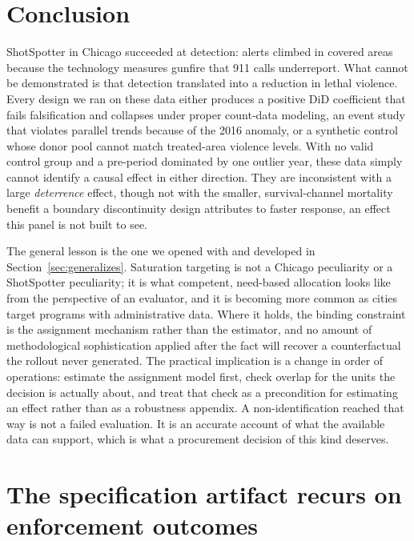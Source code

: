 \documentclass[12pt]{article}
\begin{document}
\section{Conclusion}

ShotSpotter in Chicago succeeded at detection: alerts climbed in covered areas because
the technology measures gunfire that 911 calls underreport. What cannot be demonstrated
is that detection translated into a reduction in lethal violence. Every design we ran on
these data either produces a positive DiD coefficient that fails falsification and
collapses under proper count-data modeling, an event study that violates parallel trends
because of the 2016 anomaly, or a synthetic control whose donor pool cannot match
treated-area violence levels. With no valid control group and a pre-period dominated by
one outlier year, these data simply cannot identify a causal effect in either direction.
They are inconsistent with a large \emph{deterrence} effect, though not with the smaller,
survival-channel mortality benefit a boundary discontinuity design attributes to faster
response, an effect this panel is not built to see.

The general lesson is the one we opened with and developed in
Section~\ref{sec:generalizes}. Saturation targeting is not a Chicago
peculiarity or a ShotSpotter peculiarity; it is what competent, need-based allocation looks
like from the perspective of an evaluator, and it is becoming more common as cities target
programs with administrative data. Where it holds, the binding constraint is the assignment
mechanism rather than the estimator, and no amount of methodological sophistication applied
after the fact will recover a counterfactual the rollout never generated. The practical
implication is a change in order of operations: estimate the assignment model first, check
overlap for the units the decision is actually about, and treat that check as a
precondition for estimating an effect rather than as a robustness appendix. A
non-identification reached that way is not a failed evaluation. It is an accurate account
of what the available data can support, which is what a procurement decision of this kind
deserves.

\appendix
\section{The specification artifact recurs on enforcement outcomes}
\label{app:procedural}
\end{document}
